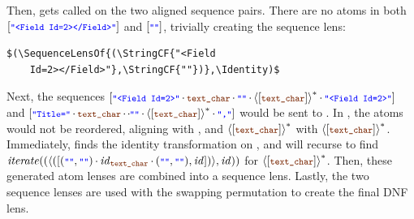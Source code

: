 \documentclass[acmsmall]{acmart}
\begin{document}
Then, \RigidSynthSequence{} gets called on the two aligned sequence pairs.
There are no atoms in both
$\SequenceOf{\StringCF{"<Field Id=2></Field>"}}$ and
$\SequenceOf{\StringCF{""}}$, trivially creating the 
sequence lens:
\begin{lstlisting}
$(\SequenceLensOf{(\StringCF{"<Field
    Id=2></Field>"},\StringCF{""})},\Identity)$
\end{lstlisting}
Next, the sequences
$\SequenceOf{\StringCF{"<Field Id=2>"} \SeqSep \TextChar
  \SeqSep \StringCF{""}
  \SeqSep \StarOf{\DNFOf{\SequenceOf{\TextChar}}}
  \SeqSep \StringCF{"<Field Id=2>"}}$
and
$\SequenceOf{\StringCF{"Title="} \SeqSep
  \VarCF{text\_char} \SeqSep
  \SeqSep \StringCF{""}
  \SeqSep \StarOf{\DNFOf{\SequenceOf{\TextChar}}}
  \SeqSep \StringCF{","}}$
would be sent
to \RigidSynthSequence{}.
In \RigidSynthSequence{}, the atoms would not be reordered, aligning  with
, and $\StarOf{\DNFOf{\SequenceOf{\VarCF{text\_char}}}}$ with
$\StarOf{\DNFOf{\SequenceOf{\VarCF{text\_char}}}}$.
Immediately, \RigidSynthAtom{} finds the
identity transformation on , and will recurse to find
$\IterateLensOf{(\DNFLensOf{(\SequenceLensOf{(\StringCF{""},\StringCF{""})
      \SeqSep \IdentityLensOf{\TextChar} \SeqSep (\StringCF{""},\StringCF{""}),
  \Identity})}, \Identity)}$ 
for $\StarOf{\DNFOf{\SequenceOf{\VarCF{text\_char}}}}$.
  Then, these generated atom lenses are combined into a
sequence lens.  Lastly, the two sequence lenses are used with the swapping
permutation to create the final DNF lens.
\end{document}

